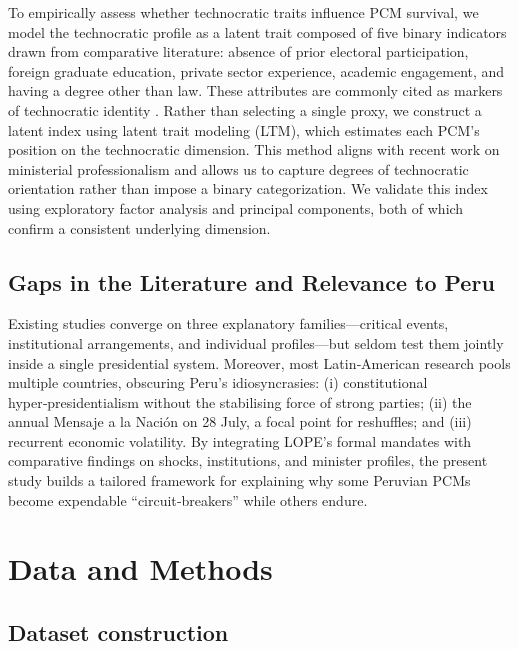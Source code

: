 \documentclass[a4paper, 12pt]{article}
\begin{document}
To empirically assess whether technocratic traits influence PCM survival, we model the technocratic profile as a latent trait composed of five binary indicators drawn from comparative literature: absence of prior electoral participation, foreign graduate education, private sector experience, academic engagement, and having a degree other than law. These attributes are commonly cited as markers of technocratic identity 
\citep{carreras_presidentes_2013,alexiadou_commitment_2019,alexiadou_ideologues_2015,escobar-lemmon_coming_2010}. Rather than selecting a single proxy, we construct a latent index using latent trait modeling (LTM), which estimates each PCM’s position on the technocratic dimension. This method aligns with recent work on ministerial professionalism \citep{bersch_state_2017} and allows us to capture degrees of technocratic orientation rather than impose a binary categorization. We validate this index using exploratory factor analysis and principal components, both of which confirm a consistent underlying dimension.

% 

\subsection{Gaps in the Literature and Relevance to Peru}

Existing studies converge on three explanatory families—critical events, institutional arrangements, and individual profiles—but seldom test them jointly inside a single presidential system.  Moreover, most Latin‑American research pools multiple countries, obscuring Peru’s idiosyncrasies: (i) constitutional hyper‑presidentialism without the stabilising force of strong parties; (ii) the annual Mensaje a la Nación on 28 July, a focal point for reshuffles; and (iii) recurrent economic volatility.  By integrating LOPE’s formal mandates with comparative findings on shocks, institutions, and minister profiles, the present study builds a tailored framework for explaining why some Peruvian PCMs become expendable “circuit‑breakers” while others endure.



\section{Data and Methods}

\subsection{Dataset construction}
\end{document}
